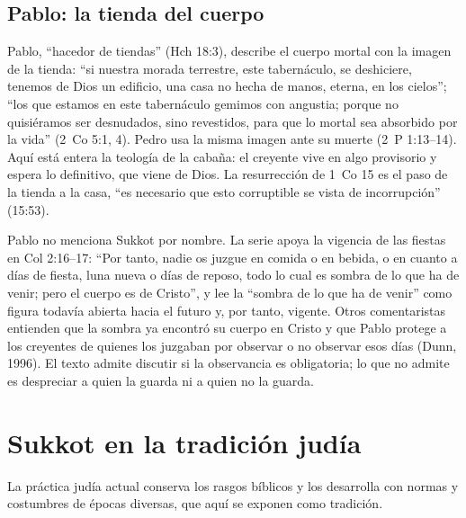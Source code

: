 \documentclass[11pt,letterpaper]{article}
\begin{document}
\subsection{Pablo: la tienda del cuerpo}
Pablo, ``hacedor de tiendas'' (Hch 18:3), describe el cuerpo mortal con la imagen de la tienda: ``si nuestra morada terrestre, este tabernáculo, se deshiciere, tenemos de Dios un edificio, una casa no hecha de manos, eterna, en los cielos''; ``los que estamos en este tabernáculo gemimos con angustia; porque no quisiéramos ser desnudados, sino revestidos, para que lo mortal sea absorbido por la vida'' (2~Co 5:1, 4). Pedro usa la misma imagen ante su muerte (2~P 1:13--14). Aquí está entera la teología de la cabaña: el creyente vive en algo provisorio y espera lo definitivo, que viene de Dios. La resurrección de 1~Co 15 es el paso de la tienda a la casa, ``es necesario que esto corruptible se vista de incorrupción'' (15:53).

Pablo no menciona Sukkot por nombre. La serie apoya la vigencia de las fiestas en Col 2:16--17: ``Por tanto, nadie os juzgue en comida o en bebida, o en cuanto a días de fiesta, luna nueva o días de reposo, todo lo cual es sombra de lo que ha de venir; pero el cuerpo es de Cristo'', y lee la ``sombra de lo que ha de venir'' como figura todavía abierta hacia el futuro y, por tanto, vigente. Otros comentaristas entienden que la sombra ya encontró su cuerpo en Cristo y que Pablo protege a los creyentes de quienes los juzgaban por observar o no observar esos días (Dunn, 1996). El texto admite discutir si la observancia es obligatoria; lo que no admite es despreciar a quien la guarda ni a quien no la guarda.

\section{Sukkot en la tradición judía}

La práctica judía actual conserva los rasgos bíblicos y los desarrolla con normas y costumbres de épocas diversas, que aquí se exponen como tradición.
\end{document}
